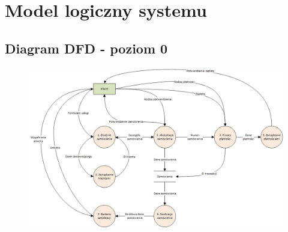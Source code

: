 \documentclass{article}
\begin{document}
\newpage
\section{Model logiczny systemu}
\subsection{Diagram DFD - poziom 0}

\begin{figure}[h]
\includegraphics[scale=0.7]{dfd.png}
\label{fig: dfd0}
\end{figure}
\end{document}
